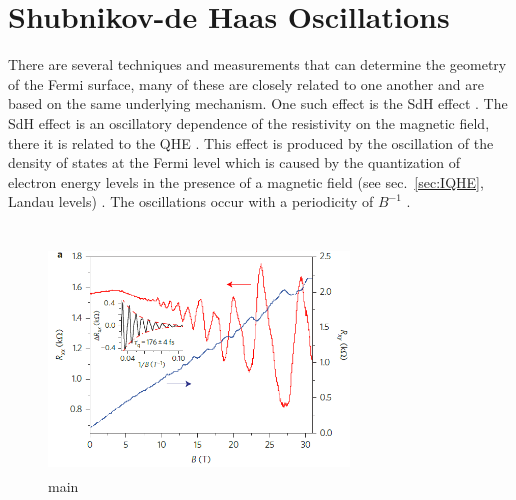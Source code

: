 \section{Shubnikov-de Haas Oscillations}\label{sec:qm_oscillations}
There are several techniques and measurements that can determine the geometry of the Fermi surface, many of these are closely related to one another and are based on the same underlying mechanism. One such effect is the \acs{SdH} effect \cite{Shubnikov_Leiden1930}. The \acs{SdH} effect is an oscillatory dependence of the resistivity on the magnetic field, there it is related to the \ac{QHE} \cite{Soule_PhysRev1964}. This effect is produced by the oscillation of the density of states at the Fermi level which is caused by the quantization of electron energy levels in the presence of a magnetic field (see sec.~\ref{sec:IQHE}, Landau levels) \cite{Peierls_ZPhys1933,Landau_RoyalSoc1939}. The oscillations occur with a periodicity of $B^{-1}$ \cite{Shoenberg_Magnet1984}.\\ \\
\begin{figure}[ht]
	\centering
	\includegraphics[height=6cm,width=8cm]{figs/future/mos2_SdH_oscillations}
	\caption[ quantum Hall effect and Shubnikov-de Haas oscillations]{main}
	\label{fig:mos2_SdH}
\end{figure}
